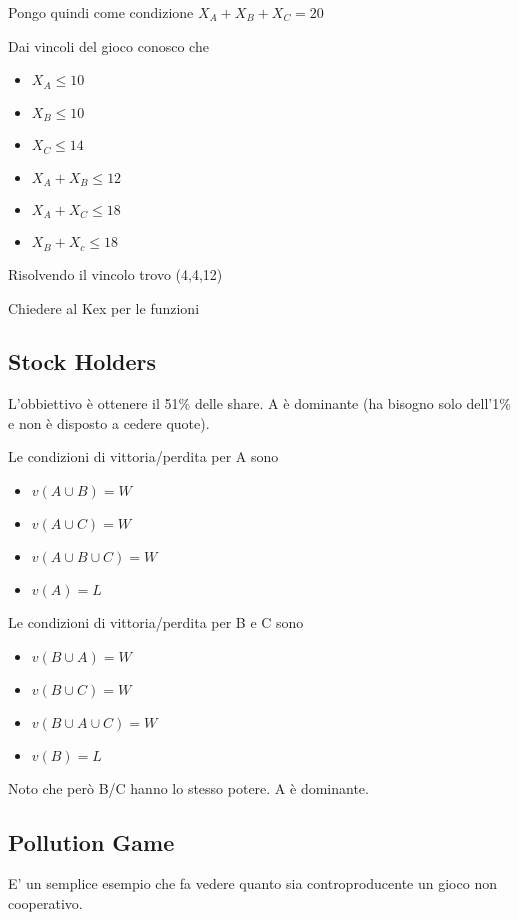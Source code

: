 \documentclass[10pt,a4paper]{report}
\begin{document}
        Pongo quindi come condizione $X_A + X_B + X_C = 20$

        Dai vincoli del gioco conosco che 
        \begin{itemize}
            \item $X_A \le 10$
            \item $X_B \le 10$
            \item $X_C \le 14$
            \item $X_A + X_B \le 12$
            \item $X_A + X_C \le 18$
            \item $X_B + X_c \le 18$
        \end{itemize}

        Risolvendo il vincolo trovo (4,4,12)

        Chiedere al Kex per le funzioni
        
        \subsection{Stock Holders}
        L'obbiettivo è ottenere il 51\% delle share. A è dominante (ha bisogno solo dell'1\% e non è disposto a cedere quote).

        Le condizioni di vittoria/perdita per A sono 
        \begin{itemize}
            \item $v(A \cup B) = W$
            \item $v(A \cup C) = W$
            \item $v(A \cup B \cup C) = W$
            \item $v(A) = L$
        \end{itemize}

        Le condizioni di vittoria/perdita per B e C sono 
        \begin{itemize}
            \item $v(B \cup A) = W$
            \item $v(B \cup C) = W$
            \item $v(B \cup A \cup C) = W$
            \item $v(B) = L$
        \end{itemize}

        Noto che però B/C hanno lo stesso potere. A è dominante.

        \subsection{Pollution Game}
        E' un semplice esempio che fa vedere quanto sia controproducente un gioco non cooperativo.
\end{document}
